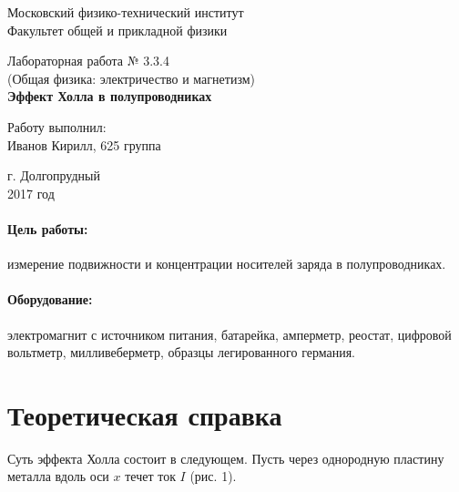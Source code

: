 \documentclass[12pt]{kiarticle}
\begin{document}
	
	\begin{titlepage}
		\begin{center}
			\large 	Московский физико-технический институт \\
			Факультет общей и прикладной физики \\
			\vspace{0.2cm}
			
			\vspace{4.5cm}
			Лабораторная работа № 3.3.4 \\ \vspace{0.2cm}
			\large (Общая физика: электричество и магнетизм) \\ \vspace{0.2cm}
			\LARGE \textbf{Эффект Холла в полупроводниках}
		\end{center}
		\vspace{2.3cm} \large
		
		\begin{center}
			Работу выполнил: \\
			Иванов Кирилл,
			625 группа
			\vspace{10mm}		
			
		\end{center}
		
		\begin{center} \vspace{60mm}
			г. Долгопрудный \\
			2017 год
		\end{center}
	\end{titlepage}
	
	
	\paragraph*{Цель работы:} измерение подвижности и концентрации носителей заряда в полупроводниках.
	
	\paragraph*{Оборудование:} электромагнит с источником питания, батарейка, амперметр, реостат, цифровой вольтметр, милливеберметр, образцы легированного германия.
	
	\section{Теоретическая справка}
	Суть эффекта Холла состоит в следующем. Пусть через однородную пластину металла вдоль оси $x$ течет ток $I$ (рис. 1).
	
\end{document}
